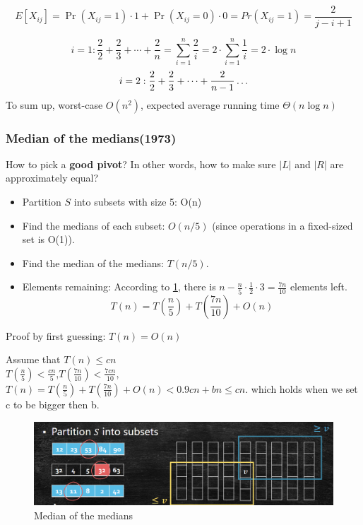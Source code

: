     \[
        E[X_{ij}]=\Pr(X_{ij}=1)\cdot 1 + \Pr(X_{ij}=0)\cdot 0=Pr(X_{ij}=1)=\frac{2}{j-i+1}\]

    \[
        i=1:\frac{2}{2}+\frac{2}{3}+\cdots+\frac{2}{n}=\sum_{i=1}^{n}\frac{2}{i}=2\cdot \sum_{i=1}^{n}\frac{1}{i}=2\cdot \log n\]
    \[
        i=2:\frac{2}{2}+\frac{2}{3}+\cdots+\frac{2}{n-1}\\
        \ldots
    \]
    To sum up, worst-case $O(n^2)$, expected average running time $\Theta(n\log n)$



\subsubsection{Median of the medians(1973)}

How to pick a \textbf{good pivot}? In other words, how to make sure $|L|$ and $|R|$ are approximately equal?
\begin{itemize}
\item Partition $S$ into subsets with size 5: O(n)
\item Find the medians of each subset: $O(n/5)$ (since operations in a fixed-sized set is O(1)).
\item Find the median of the medians: $T(n/5)$.
\item Elements remaining: According to \ref{fig:medianofmedians}, there is $n-\frac{n}{5} \cdot \frac{1}{2}\cdot 3 = \frac{7n}{10}$ elements left.
\[
    T(n)=T(\frac{n}{5})+T(\frac{7n}{10})+O(n)\]
\end{itemize}

\begin{prf}Proof by first guessing: $T(n)=O(n)$
    
Assume that $T(n) \leq cn$\\
$T(\frac{n}{5})<\frac{cn}{5}$,$T(\frac{7n}{10})<\frac{7cn}{10}$,
$T(n)=T(\frac{n}{5})+T(\frac{7n}{10})+O(n)<0.9cn+bn\leq cn$. which holds when we set c to be bigger then b.

\end{prf}

\begin{figure}
    \centering
    \includegraphics[width=0.8\linewidth]{Notes/fig/MofM.png}
    \caption{Median of the medians}
    \label{fig:medianofmedians}
\end{figure}

